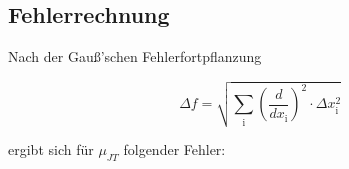 \documentclass[12pt,a4paper,titlepage,headinclude,bibtotoc]{scrartcl}
\begin{document}




\subsection{Fehlerrechnung}
Nach der Gauß'schen Fehlerfortpflanzung

\begin{equation}
\Delta f = \sqrt{\sum_\mathrm{i} \left(\frac{d}{dx_\mathrm{i}}\right)^{2} \cdot \Delta x_\mathrm{i}^2}
\end{equation}


ergibt sich für $\mu_{JT}$ folgender Fehler:\\
\end{document}

